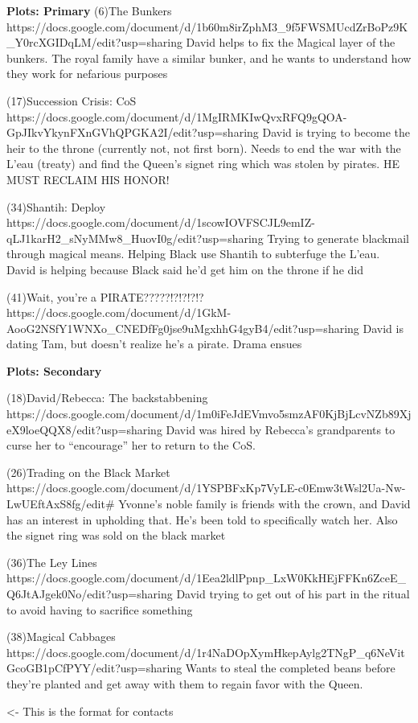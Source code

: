 \documentclass[char]{GL2020}
\begin{document}
\textbf{Plots: Primary}
(6)The Bunkers
https://docs.google.com/document/d/1b60m8irZphM3_9f5FWSMUcdZrBoPz9K_Y0rcXGIDqLM/edit?usp=sharing
David helps to fix the Magical layer of the bunkers.  The royal family have a similar bunker, and he wants to understand how they work for nefarious purposes

(17)Succession Crisis: CoS
https://docs.google.com/document/d/1MgIRMKIwQvxRFQ9gQOA-GpJIkvYkynFXnGVhQPGKA2I/edit?usp=sharing
David is trying to become the heir to the throne (currently not, not first born).  Needs to end the war with the L'eau (treaty) and find the Queen's signet ring which was stolen by pirates.  HE MUST RECLAIM HIS HONOR!

(34)Shantih: Deploy
https://docs.google.com/document/d/1scowIOVFSCJL9emIZ-qLJ1karH2_sNyMMw8_HuovI0g/edit?usp=sharing
Trying to generate blackmail through magical means.  Helping Black use Shantih to subterfuge the L'eau.  David is helping because Black said he'd get him on the throne if he did

(41)Wait, you're a PIRATE?????!?!?!?!?
https://docs.google.com/document/d/1GkM-AooG2NSfY1WNXo_CNEDfFg0jse9uMgxhhG4gyB4/edit?usp=sharing
David is dating Tam, but doesn't realize he's a pirate.  Drama ensues

\textbf{Plots: Secondary}

(18)David/Rebecca: The backstabbening
https://docs.google.com/document/d/1m0iFeJdEVmvo5smzAF0KjBjLcvNZb89XjeX9loeQQX8/edit?usp=sharing
David was hired by Rebecca's grandparents to curse her to "`encourage"' her to return to the CoS. 

(26)Trading on the Black Market
https://docs.google.com/document/d/1YSPBFxKp7VyLE-c0Emw3tWsl2Ua-Nw-LwUEftAxS8fg/edit#
Yvonne’s noble family is friends with the crown, and David has an interest in upholding that. He’s been told to specifically watch her.  Also the signet ring was sold on the black market

(36)The Ley Lines
https://docs.google.com/document/d/1Eea2ldlPpnp_LxW0KkHEjFFKn6ZceE_Q6JtAJgek0No/edit?usp=sharing
David trying to get out of his part in the ritual to avoid having to sacrifice something

(38)Magical Cabbages
https://docs.google.com/document/d/1r4NaDOpXymHkepAylg2TNgP_q6NeVitGcoGB1pCfPYY/edit?usp=sharing
Wants to steal the completed beans before they’re planted and get away with them to regain favor with the Queen.

\begin{itemz}[Goals]
	\item 
\end{itemz}

\begin{itemz}[Notes]
	\item 
\end{itemz}

\begin{contacts}
	\contact{\cTest{}} <- This is the format for contacts 
\end{contacts}
\end{document}
